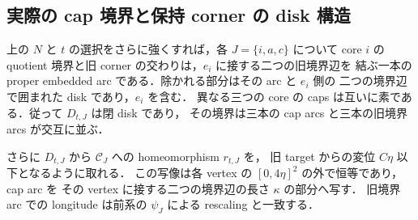 \subsection{実際の cap 境界と保持 corner の disk 構造}

\begin{lemma}
\label{ke:corner-cap-disk}
上の $N$ と $t$ の選択をさらに強くすれば，各 $J=\{i,a,c\}$ について
core $i$ の quotient 境界と旧 corner の交わりは，$e_i$ に接する二つの旧境界辺を
結ぶ一本の proper embedded arc である．除かれる部分はその arc と $e_i$ 側の
二つの境界辺で囲まれた disk であり，$e_i$ を含む．
異なる三つの core の caps は互いに素である．従って $D_{t,J}$ は閉 disk であり，
その境界は三本の cap arcs と三本の旧境界 arcs が交互に並ぶ．

さらに $D_{t,J}$ から $\mathcal C_J$ への homeomorphism $r_{t,J}$ を，
旧 target からの変位 $C\eta$ 以下となるように取れる．
この写像は各 vertex の $[0,4\eta]^2$ の外で恒等であり，cap arc を
その vertex に接する二つの境界辺の長さ $\kappa$ の部分へ写す．
旧境界 arc での longitude は前系の $\psi_J$ による rescaling と一致する．
\end{lemma}

